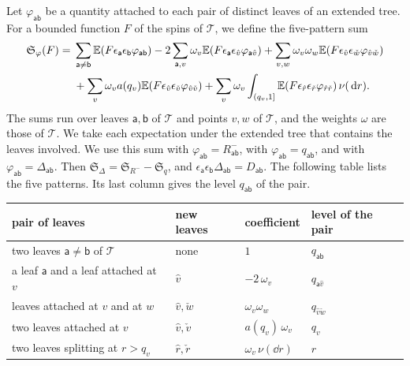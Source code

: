 Let $\varphi_{\mathsf{ab}}$ be a quantity attached to each pair of
distinct leaves of an extended tree. For a bounded function $F$ of the
spins of $\mathcal T$, we define the five-pattern sum
\[
 \begin{aligned}
 \mathfrak S_\varphi(F)={}&
 \sum_{\mathsf a\ne\mathsf b}\mathbb E(F\epsilon_{\mathsf a}\epsilon_{\mathsf b}
   \varphi_{\mathsf{ab}})
 -2\sum_{\mathsf a,v}\omega_v\mathbb E(F\epsilon_{\mathsf a}\epsilon_{\hat v}
   \varphi_{\mathsf a\hat v})
 +\sum_{v,w}\omega_v\omega_w\mathbb E(F\epsilon_{\hat v}\epsilon_{\check w}
   \varphi_{\hat v\check w})\\
 &+\sum_v\omega_va(q_v)\mathbb E(F\epsilon_{\hat v}\epsilon_{\check v}
   \varphi_{\hat v\check v})
 +\sum_v\omega_v\int_{(q_v,1]}\mathbb E(F\epsilon_{\hat r}\epsilon_{\check r}
   \varphi_{\hat r\check r})\,\nu(\,\mathrm d r).
 \end{aligned}
\]
The sums run over leaves $\mathsf a,\mathsf b$ of $\mathcal T$ and points
$v,w$ of $\mathcal T$, and the weights $\omega$ are those of
$\mathcal T$. We take each expectation under the extended tree that
contains the leaves involved. We use this sum with
$\varphi_{\mathsf{ab}}=R^-_{\mathsf{ab}}$, with
$\varphi_{\mathsf{ab}}=q_{\mathsf{ab}}$, and with
$\varphi_{\mathsf{ab}}=\Delta_{\mathsf{ab}}$. Then
$\mathfrak S_\Delta=\mathfrak S_{R^-}-\mathfrak S_q$, and
$\epsilon_{\mathsf a}\epsilon_{\mathsf b}\Delta_{\mathsf{ab}}=D_{\mathsf{ab}}$.
The following table lists the five patterns. Its last column gives the
level $q_{\mathsf{ab}}$ of the pair.
\begin{center}
\small
\begin{tabular}{@{}llll@{}}
\toprule
pair of leaves & new leaves & coefficient & level of the pair\\
\midrule
two leaves $\mathsf a\ne\mathsf b$ of $\mathcal T$ & none & $1$
  & $q_{\mathsf{ab}}$\\
a leaf $\mathsf a$ and a leaf attached at $v$ & $\hat v$
  & $-2\,\omega_v$ & $q_{\mathsf a\hat v}$\\
leaves attached at $v$ and at $w$ & $\hat v,\check w$
  & $\omega_v\omega_w$ & $q_{\hat v\check w}$\\
two leaves attached at $v$ & $\hat v,\check v$ & $a(q_v)\,\omega_v$
  & $q_v$\\
two leaves splitting at $r>q_v$ & $\hat r,\check r$
  & $\omega_v\,\nu(\dd r)$ & $r$\\
\bottomrule
\end{tabular}
\end{center}

